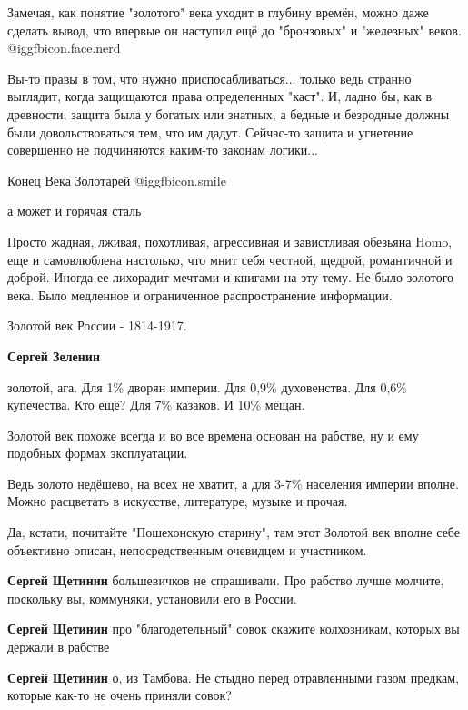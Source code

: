 \begin{itemize}

Замечая, как понятие "золотого" века уходит в глубину времён, можно даже
сделать вывод, что впервые он наступил ещё до "бронзовых" и "железных" веков.
 @igg{fbicon.face.nerd} 


Вы-то правы в том, что нужно приспосабливаться... только ведь странно выглядит,
когда защищаются права определенных "каст". И, ладно бы, как в древности,
защита была у богатых или знатных, а бедные и безродные должны были
довольствоваться тем, что им дадут. Сейчас-то защита и угнетение совершенно не
подчиняются каким-то законам логики...

Конец Века Золотарей  @igg{fbicon.smile} 

а может и горячая сталь


Просто жадная, лживая, похотливая, агрессивная и завистливая обезьяна Homo, еще
и самовлюблена настолько, что мнит себя честной, щедрой, романтичной и доброй.
Иногда ее лихорадит мечтами и книгами на эту тему. Не было золотого века. Было
медленное и ограниченное распространение информации.

Золотой век России - 1814-1917.

\begin{itemize} %
\textbf{Сергей Зеленин} 

золотой, ага.
Для 1\% дворян империи.
Для 0,9\% духовенства.
Для 0,6\% купечества.
Кто ещё? Для 7\% казаков. И 10\% мещан.

Золотой век похоже всегда и во все времена основан на рабстве, ну и ему
подобных формах эксплуатации.

Ведь золото недёшево, на всех не хватит, а для 3-7\% населения империи вполне.
Можно расцветать в искусстве, литературе, музыке и прочая.

Да, кстати, почитайте "Пошехонскую старину", там этот Золотой век вполне себе
объективно описан, непосредственным очевидцем и участником.

\textbf{Сергей Щетинин} большевичков не спрашивали.
Про рабство лучше молчите, поскольку вы, коммуняки, установили его в России.

\textbf{Сергей Щетинин} про "благодетельный" совок скажите колхозникам, которых вы держали в рабстве

\textbf{Сергей Щетинин} о, из Тамбова. Не стыдно перед отравленными газом предкам, которые как-то не очень приняли совок?


\end{itemize}
\end{itemize}
